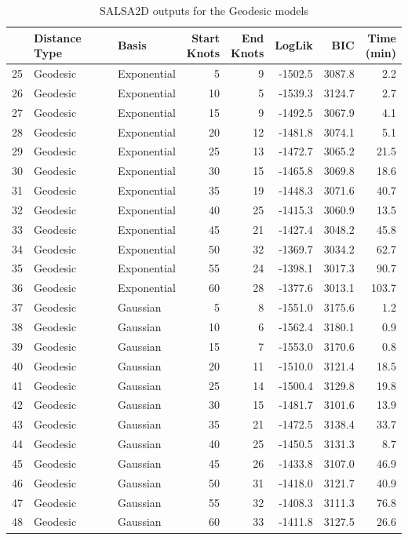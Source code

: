 \begin{table}[!htb]
\begin{longtable}{|l|l|l|r|r|r|r|r|}
\hline
  & Distance Type & Basis & \makecell[r]{Start \\Knots} & \makecell[l]{End \\Knots} & LogLik & BIC & \makecell[l]{Time \\(min)}\\
\hline
25 & Geodesic & Exponential & 5 & 9 & -1502.5 & 3087.8 & 2.2\\
\hline
26 & Geodesic & Exponential & 10 & 5 & -1539.3 & 3124.7 & 2.7\\
\hline
27 & Geodesic & Exponential & 15 & 9 & -1492.5 & 3067.9 & 4.1\\
\hline
28 & Geodesic & Exponential & 20 & 12 & -1481.8 & 3074.1 & 5.1\\
\hline
29 & Geodesic & Exponential & 25 & 13 & -1472.7 & 3065.2 & 21.5\\
\hline
30 & Geodesic & Exponential & 30 & 15 & -1465.8 & 3069.8 & 18.6\\
\hline
31 & Geodesic & Exponential & 35 & 19 & -1448.3 & 3071.6 & 40.7\\
\hline
32 & Geodesic & Exponential & 40 & 25 & -1415.3 & 3060.9 & 13.5\\
\hline
33 & Geodesic & Exponential & 45 & 21 & -1427.4 & 3048.2 & 45.8\\
\hline
34 & Geodesic & Exponential & 50 & 32 & -1369.7 & 3034.2 & 62.7\\
\hline
35 & Geodesic & Exponential & 55 & 24 & -1398.1 & 3017.3 & 90.7\\
\hline
36 & Geodesic & Exponential & 60 & 28 & -1377.6 & 3013.1 & 103.7\\
\hline
37 & Geodesic & Gaussian & 5 & 8 & -1551.0 & 3175.6 & 1.2\\
\hline
38 & Geodesic & Gaussian & 10 & 6 & -1562.4 & 3180.1 & 0.9\\
\hline
39 & Geodesic & Gaussian & 15 & 7 & -1553.0 & 3170.6 & 0.8\\
\hline
40 & Geodesic & Gaussian & 20 & 11 & -1510.0 & 3121.4 & 18.5\\
\hline
41 & Geodesic & Gaussian & 25 & 14 & -1500.4 & 3129.8 & 19.8\\
\hline
42 & Geodesic & Gaussian & 30 & 15 & -1481.7 & 3101.6 & 13.9\\
\hline
43 & Geodesic & Gaussian & 35 & 21 & -1472.5 & 3138.4 & 33.7\\
\hline
44 & Geodesic & Gaussian & 40 & 25 & -1450.5 & 3131.3 & 8.7\\
\hline
45 & Geodesic & Gaussian & 45 & 26 & -1433.8 & 3107.0 & 46.9\\
\hline
46 & Geodesic & Gaussian & 50 & 31 & -1418.0 & 3121.7 & 40.9\\
\hline
47 & Geodesic & Gaussian & 55 & 32 & -1408.3 & 3111.3 & 76.8\\
\hline
48 & Geodesic & Gaussian & 60 & 33 & -1411.8 & 3127.5 & 26.6\\
\hline
\end{longtable}
\caption{SALSA2D outputs for the Geodesic models}
\label{tab:outputsgeo}
\end{table}

